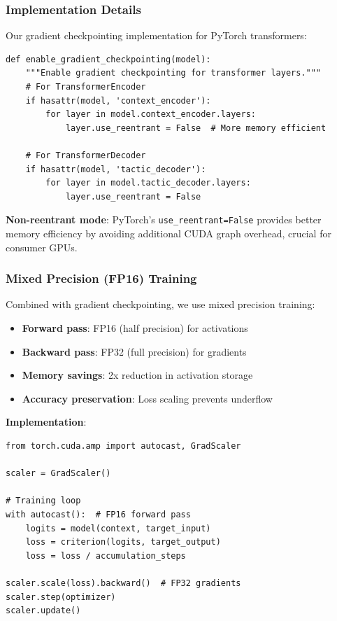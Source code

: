 \documentclass[12pt]{article}
\begin{document}
\subsubsection{Implementation Details}

Our gradient checkpointing implementation for PyTorch transformers:

\begin{verbatim}
def enable_gradient_checkpointing(model):
    """Enable gradient checkpointing for transformer layers."""
    # For TransformerEncoder
    if hasattr(model, 'context_encoder'):
        for layer in model.context_encoder.layers:
            layer.use_reentrant = False  # More memory efficient

    # For TransformerDecoder
    if hasattr(model, 'tactic_decoder'):
        for layer in model.tactic_decoder.layers:
            layer.use_reentrant = False
\end{verbatim}

\textbf{Non-reentrant mode}: PyTorch's \texttt{use\_reentrant=False} provides better memory efficiency by avoiding additional CUDA graph overhead, crucial for consumer GPUs.

\subsubsection{Mixed Precision (FP16) Training}

Combined with gradient checkpointing, we use mixed precision training:

\begin{itemize}
\item \textbf{Forward pass}: FP16 (half precision) for activations
\item \textbf{Backward pass}: FP32 (full precision) for gradients
\item \textbf{Memory savings}: 2x reduction in activation storage
\item \textbf{Accuracy preservation}: Loss scaling prevents underflow
\end{itemize}

\textbf{Implementation}:
\begin{verbatim}
from torch.cuda.amp import autocast, GradScaler

scaler = GradScaler()

# Training loop
with autocast():  # FP16 forward pass
    logits = model(context, target_input)
    loss = criterion(logits, target_output)
    loss = loss / accumulation_steps

scaler.scale(loss).backward()  # FP32 gradients
scaler.step(optimizer)
scaler.update()
\end{verbatim}
\end{document}
